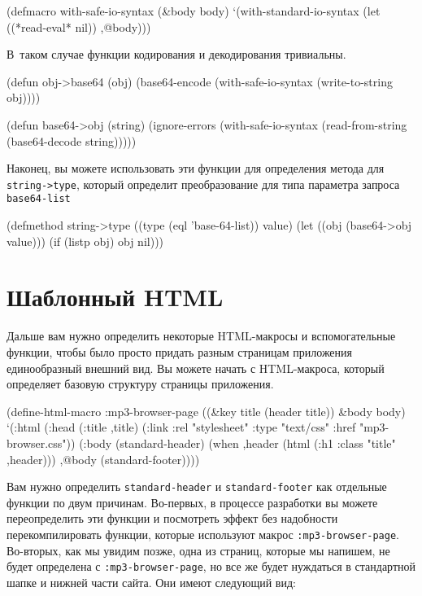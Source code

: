 \begin{myverb}
(defmacro with-safe-io-syntax (&body body)
  `(with-standard-io-syntax
     (let ((*read-eval* nil))
       ,@body)))
\end{myverb}

В~таком случае функции кодирования и декодирования тривиальны.

\begin{myverb}
(defun obj->base64 (obj)
  (base64-encode (with-safe-io-syntax (write-to-string obj))))

(defun base64->obj (string)
  (ignore-errors
    (with-safe-io-syntax (read-from-string (base64-decode string)))))
\end{myverb}

Наконец, вы можете использовать эти функции для определения метода для
\lstinline!string->type!, который определит преобразование для типа параметра запроса
\lstinline{base64-list}

\begin{myverb}
(defmethod string->type ((type (eql 'base-64-list)) value)
  (let ((obj (base64->obj value)))
    (if (listp obj) obj nil)))
\end{myverb}

\section{Шаблонный HTML}

Дальше вам нужно определить некоторые HTML-макросы и вспомогательные функции, чтобы было
просто придать разным страницам приложения единообразный внешний вид. Вы можете начать с
HTML-макроса, который определяет базовую структуру страницы приложения.

\begin{myverb}
(define-html-macro :mp3-browser-page ((&key title (header title)) &body body)
  `(:html
     (:head
      (:title ,title)
      (:link :rel "stylesheet" :type "text/css" :href "mp3-browser.css"))
     (:body
      (standard-header)
      (when ,header (html (:h1 :class "title" ,header)))
      ,@body
      (standard-footer))))
\end{myverb}

Вам нужно определить \lstinline{standard-header} и \lstinline{standard-footer} как отдельные функции
по двум причинам. Во-первых, в процессе разработки вы можете переопределить эти функции и
посмотреть эффект без надобности перекомпилировать функции, которые используют
макрос \lstinline{:mp3-browser-page}. Во-вторых, как мы увидим позже, одна из страниц, которые
мы напишем, не будет определена с \lstinline{:mp3-browser-page}, но все же будет нуждаться в
стандартной шапке и нижней части сайта. Они имеют следующий вид:


